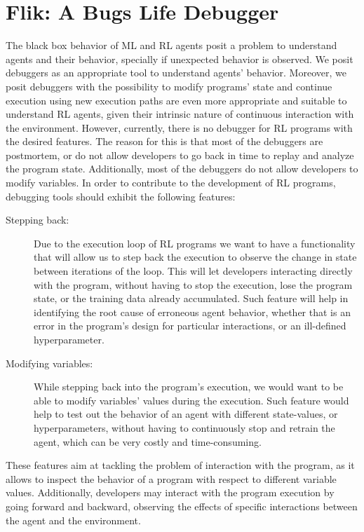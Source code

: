 
\section{Flik: A Bugs Life Debugger}
\label{sec:solution}

The black box behavior of \ac{ML} and \ac{RL} agents posit a problem to understand agents and 
their behavior, specially if unexpected behavior is observed. We posit debuggers as an appropriate 
tool to understand agents' behavior. Moreover, we posit debuggers with the possibility to modify 
programs' state and continue execution using new execution paths are even more appropriate and 
suitable to understand \ac{RL} agents, given their intrinsic nature of continuous interaction with the 
environment. However, currently, there is no debugger for \ac{RL} programs with the desired 
features. The reason for this is that most of the debuggers are postmortem, or do not allow developers
to go back in time to replay and analyze the program state. Additionally, most of the debuggers do not 
allow developers to modify variables. In order to contribute to the development of \ac{RL} programs, 
debugging tools should exhibit the following features:

\begin{description}
    \item[Stepping back:] Due to the execution loop of \ac{RL} programs we 
    want to have a functionality that will allow us to step back the execution to observe the change 
    in state between iterations of the loop. This will let developers interacting directly with the program, 
    without having to stop the execution,  lose the program state, or the training data already 
    accumulated. Such feature will help in identifying the root cause of erroneous agent behavior, 
    whether that is an error in the program's design for particular interactions, or an ill-defined 
    hyperparameter. 
    \item [Modifying variables:] While stepping back into the program's execution, we would want to be 
    able to modify variables' values during the execution. Such feature would help to test out the 
    behavior of an agent with different state-values, or hyperparameters, without having to 
    continuously stop and retrain the agent, which can be very costly and time-consuming. 
\end{description}

These features aim at tackling the problem of interaction with the program, as it allows 
to inspect the behavior of a program with respect to different variable values. Additionally, 
developers may interact with the program execution by going forward and backward, observing the 
effects of specific interactions between the agent and the environment.

